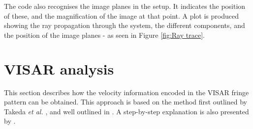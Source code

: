 The code also recognises the image planes in the setup. It indicates the position of these, and the magnification of the image at that point. A plot is produced showing the ray propagation through the system, the different components, and the position of the image planes - as seen in Figure \ref{fig:Ray trace}.

\section{VISAR analysis}
\label{appdx: VISAR analysis}
This section describes how the velocity information encoded in the VISAR fringe pattern can be obtained. This approach is based on the method first outlined by Takeda \textit{et al.} \cite{Takeda1982}, and well outlined in \cite{Celliers2004}. A step-by-step explanation is also presented by \cite{Hammel2017}.

